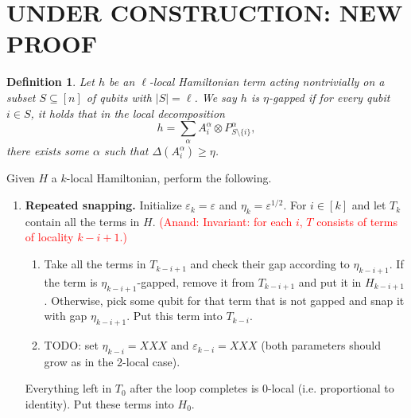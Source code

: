 \documentclass[11pt]{article}
\theoremstyle{plain}
\newtheorem{definition}[theorem]{Definition}
\newcommand{\eps}{\varepsilon}
\newcommand{\AnandNote}[1]{\textcolor{red}{(Anand: #1)}}
\newcommand{\AnandNote}[1]{}
\begin{document}
\newpage
\fi
\iffalse
\section{UNDER CONSTRUCTION: NEW PROOF}

\begin{definition}
    Let $h$ be an $\ell$-local Hamiltonian term acting nontrivially on a subset $S \subseteq [n]$ of qubits with $|S| = \ell$. We say $h$ is \emph{$\eta$-gapped} if for every qubit $i \in S$, it holds that in the local decomposition
    \[ h = \sum_{\alpha} A^\alpha_i \otimes P^\alpha_{S \setminus \{i\}} ,\]
    there exists some $\alpha$ such that $\Delta(A^\alpha_i) \geq \eta$. 
\end{definition}

Given $H$ a $k$-local Hamiltonian, perform the following.
\begin{enumerate}
    \item \textbf{Repeated snapping.} Initialize $\eps_k = \eps$ and $\eta_k = \eps^{1/2}$. For $i \in [k]$ and let $T_{k}$ contain all the terms in $H$.
    \AnandNote{Invariant: for each $i$, $T$ consists of terms of locality $k-i+1$.}    
    \begin{enumerate}
        \item Take all the terms in $T_{k-i+1}$ and check their gap according to $\eta_{k-i+1}$. If the term is $\eta_{k-i+1}$-gapped, remove it from $T_{k-i+1}$ and put it in $H_{k-i+1}$. Otherwise, pick some qubit for that term that is not gapped and snap it with gap $\eta_{k-i+1}$. Put this term into $T_{k-i}$.
        \item TODO: set $\eta_{k-i} = XXX$ and $\eps_{k-i} = XXX$ (both parameters should grow as in the 2-local case).
    \end{enumerate}
    Everything left in $T_0$ after the loop completes is $0$-local (i.e. proportional to identity). Put these terms into $H_0$.


\end{enumerate}
\end{document}
